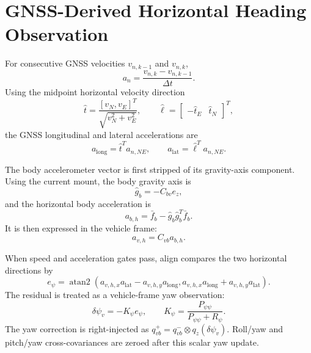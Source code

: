 \documentclass[11pt]{article}
\newcommand{\T}{^{T}}
\begin{document}
\section{GNSS-Derived Horizontal Heading Observation}

For consecutive GNSS velocities \(v_{n,k-1}\) and \(v_{n,k}\),
\begin{equation}
  a_n=\frac{v_{n,k}-v_{n,k-1}}{\Delta t}.
\end{equation}
Using the midpoint horizontal velocity direction
\begin{equation}
  \hat t=\frac{[v_N,v_E]\T}{\sqrt{v_N^2+v_E^2}},
  \qquad
  \hat \ell=\begin{bmatrix}-\hat t_E & \hat t_N\end{bmatrix}\T ,
\end{equation}
the GNSS longitudinal and lateral accelerations are
\begin{equation}
  a_{\mathrm{long}}=\hat t\T a_{n,NE},
  \qquad
  a_{\mathrm{lat}}=\hat\ell\T a_{n,NE}.
\end{equation}

The body accelerometer vector is first stripped of its gravity-axis component.
Using the current mount, the body gravity axis is
\begin{equation}
  \hat g_b=-C_{bv}e_z,
\end{equation}
and the horizontal body acceleration is
\begin{equation}
  a_{b,h}=\bar f_b-\hat g_b\hat g_b\T\bar f_b .
\end{equation}
It is then expressed in the vehicle frame:
\begin{equation}
  a_{v,h}=C_{vb}a_{b,h}.
\end{equation}

When speed and acceleration gates pass, align compares the two horizontal
directions by
\begin{equation}
  e_\psi =
  \operatorname{atan2}
  \left(
    a_{v,h,x}a_{\mathrm{lat}} - a_{v,h,y}a_{\mathrm{long}},
    a_{v,h,x}a_{\mathrm{long}} + a_{v,h,y}a_{\mathrm{lat}}
  \right).
\end{equation}
The residual is treated as a vehicle-frame yaw observation:
\begin{equation}
  \delta\psi_v=-K_\psi e_\psi,\qquad
  K_\psi=\frac{P_{\psi\psi}}{P_{\psi\psi}+R_\psi}.
\end{equation}
The yaw correction is right-injected as \(q_{vb}^{+}=q_{vb}^{-}\otimes
q_z(\delta\psi_v)\). Roll/yaw and pitch/yaw cross-covariances are zeroed after
this scalar yaw update.
\end{document}

